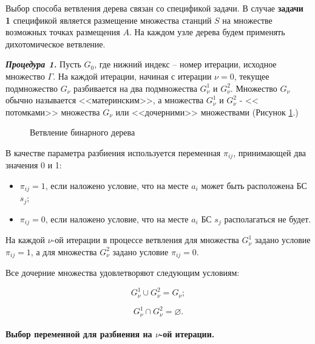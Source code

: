 Выбор способа ветвления дерева связан со спецификой задачи. В случае \textbf{задачи 1} спецификой является размещение множества станций $S$ на множестве возможных точках размещения $A$. На каждом узле дерева будем применять дихотомическое ветвление.

\textit{\textbf{Процедура 1.}} Пусть $G_0$, где нижний индекс – номер итерации, исходное множество $\Gamma$. На каждой итерации, начиная с итерации $\nu=0$, текущее подмножество $G_\nu$ разбивается на два подмножества $G^1_\nu$ и $G^2_\nu$. Множество $G_\nu$ обычно называется <<материнским>>, а множества $G^1_\nu$  и $G^2_\nu$  - << потомками>> множества $G_\nu$ или <<дочерними>> множествами (Рисунок \cref{fig:part2_bst_child_nodes}.)

\begin{figure}[ht]
  \caption{Ветвление бинарного дерева}\label{fig:part2_bst_child_nodes}
\end{figure}

В качестве параметра разбиения используется переменная $\pi_{ij}$, принимающей два значения 0 и 1:

\begin{itemize}
    \item $\pi_{ij}=1$, если наложено условие, что на месте $a_i$ может быть расположена БС $s_j$;
    \item $\pi_{ij} = 0$, если наложено условие, что на месте $a_i$ БС $s_j$  располагаться не будет.
\end{itemize}

На каждой  $\nu$-ой итерации в процессе ветвления для множества $G^1_\nu$ задано условие $\pi_{ij}=1$, а для множества $G^2_\nu$  задано условие $\pi_{ij} = 0$.

Все дочерние множества удовлетворяют следующим условиям:

\begin{equation}
    \label{eq:part4_G_cup}
    G^1_\nu \cup G^2_\nu = G_\nu;
\end{equation}


\begin{equation}
    \label{eq:part4_G_cap}
    G^1_\nu \cap G^2_\nu = \varnothing.
\end{equation}

\paragraph{Выбор переменной для разбиения на $\nu$-ой итерации.}

